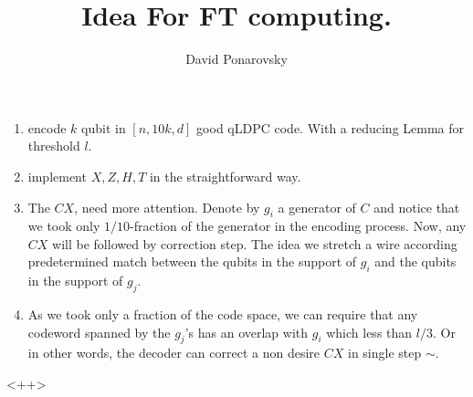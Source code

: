 \documentclass[manuscript,screen,review]{acmart}
\begin{document}

\title{Idea For FT computing.} 
\author{David Ponarovsky}

\begin{enumerate}
  \item encode $k$ qubit in $[n,10k, d]$ good qLDPC code. With a reducing Lemma for threshold $l$.  
  \item implement $X,Z,H,T$ in the straightforward way.  
  \item The $CX$, need more attention. Denote by $g_{i}$ a generator of $C$ and notice that we took only $1/10$-fraction of the generator in the encoding process. Now, any $CX$ will be followed by correction step. The idea we stretch a wire according  predetermined match between the qubits in the support of $g_{i}$ and the qubits in the support of $g_{j}$.    
  \item  As we took only a fraction of the code space, we can require that any codeword spanned by the $g_{j}$'s has an overlap with $g_{i}$ which less than $l/3$. Or in other words, the decoder can correct a non desire $CX$ in single step $\sim$.       
\end{enumerate}<++>
\printbibliography
\end{document}
